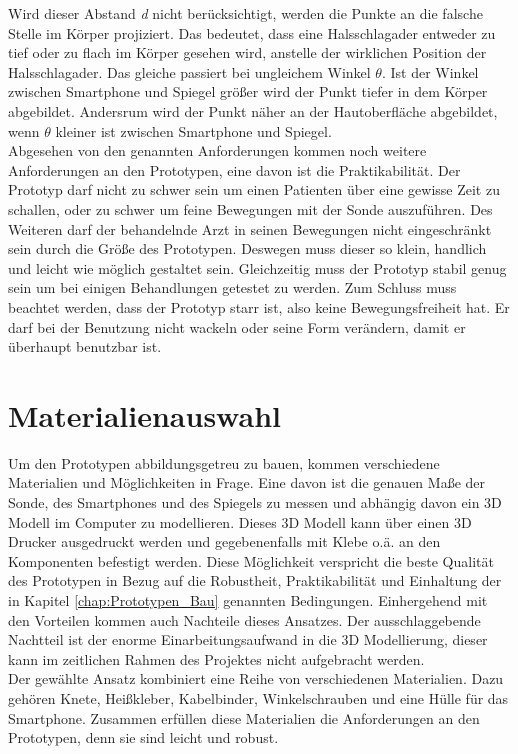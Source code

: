 Wird dieser Abstand \textit{d} nicht berücksichtigt, werden die Punkte an die falsche Stelle im Körper projiziert. Das bedeutet, dass eine Halsschlagader entweder zu tief oder zu flach im Körper gesehen wird, anstelle der wirklichen Position der Halsschlagader. Das gleiche passiert bei ungleichem Winkel $\theta$. Ist der Winkel zwischen Smartphone und Spiegel größer wird der Punkt tiefer in dem Körper abgebildet. Andersrum wird der Punkt näher an der Hautoberfläche abgebildet, wenn $\theta$ kleiner ist zwischen Smartphone und Spiegel.\\
Abgesehen von den genannten Anforderungen kommen noch weitere Anforderungen an den Prototypen, eine davon ist die Praktikabilität. Der Prototyp darf nicht zu schwer sein um einen Patienten über eine gewisse Zeit zu schallen, oder zu schwer um feine Bewegungen mit der Sonde auszuführen. Des Weiteren darf der behandelnde Arzt in seinen Bewegungen nicht eingeschränkt sein durch die Größe des Prototypen. Deswegen muss dieser so klein, handlich und leicht wie möglich gestaltet sein. Gleichzeitig muss der Prototyp stabil genug sein um bei einigen Behandlungen getestet zu werden. Zum Schluss muss beachtet werden, dass der Prototyp starr ist, also keine Bewegungsfreiheit hat. Er darf bei der Benutzung nicht wackeln oder seine Form verändern, damit er überhaupt benutzbar ist.

\section{Materialienauswahl}
Um den Prototypen abbildungsgetreu zu bauen, kommen verschiedene Materialien und Möglichkeiten in Frage. Eine davon ist die genauen Maße der Sonde, des Smartphones und des Spiegels zu messen und abhängig davon ein 3D Modell im Computer zu modellieren. Dieses 3D Modell kann über einen 3D Drucker ausgedruckt werden und gegebenenfalls mit Klebe o.ä. an den Komponenten befestigt werden. Diese Möglichkeit verspricht die beste Qualität des Prototypen in Bezug auf die Robustheit, Praktikabilität und Einhaltung der in Kapitel \ref{chap:Prototypen_Bau} genannten Bedingungen. Einhergehend mit den Vorteilen kommen auch Nachteile dieses Ansatzes. Der ausschlaggebende Nachtteil ist der enorme Einarbeitungsaufwand in die 3D Modellierung, dieser kann im zeitlichen Rahmen des Projektes nicht aufgebracht werden.\\
Der gewählte Ansatz kombiniert eine Reihe von verschiedenen Materialien. Dazu gehören Knete, Heißkleber, Kabelbinder, Winkelschrauben und eine Hülle für das Smartphone. Zusammen erfüllen diese Materialien die Anforderungen an den Prototypen, denn sie sind leicht und robust.

